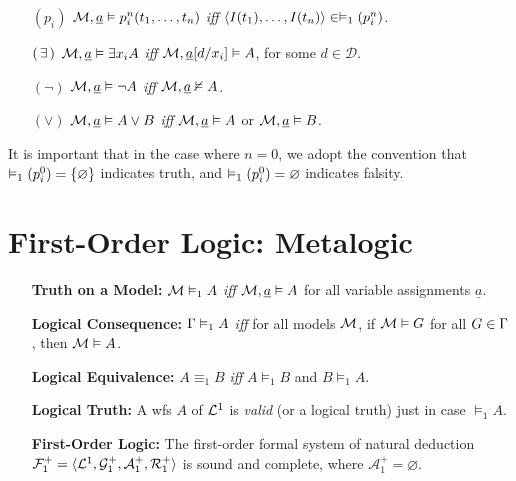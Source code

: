 \documentclass[a4paper, 11pt]{article} %
\begin{document}
\begin{enumerate}[leftmargin=1.2in]
\begin{small}
		      \begin{itemize}[leftmargin=.36in]
			      \item[$(p_i)$] $\mathcal{M},\underline{a}\vDash  p_i^n(t_1,\dots,t_n)$ \textit{iff} $\langle I(t_1),\dots,I(t_n)\rangle\in \vDash_1(p_i^n)$.
			      \item[$(\hspace{1.5pt}\exists\hspace{1.5pt})$] $\mathcal{M},\underline{a}\vDash  \exists x_iA$ \textit{iff} $\mathcal{M},\underline{a}[d/x_i]\vDash A$, for some $d\in\mathcal{D}$.
			      \item[$(\neg)$] $\mathcal{M},\underline{a}\vDash  \neg A$ \textit{iff} $\mathcal{M},\underline{a}\nvDash A$.
			      \item[$(\vee)$] $\mathcal{M},\underline{a}\vDash  A\vee B$ \textit{iff} $\mathcal{M},\underline{a}\vDash  A$ or $\mathcal{M},\underline{a}\vDash  B$.
		      \end{itemize}
	      \end{small}
	      It is important that in the case where $n=0$, we adopt the convention that $\vDash_1(p_i^0)=\lbrace\varnothing\rbrace$ indicates truth, and $\vDash_1(p_i^0)=\varnothing$ indicates falsity.
\end{enumerate}



\section*{\sc First-Order Logic: Metalogic}%

\begin{enumerate}[leftmargin=1.2in] %
	\item[\bf Truth on a Model:] $\mathcal{M}\vDash_1 A$ \textit{iff} $\mathcal{M},\underline{a}\vDash A$ for all variable assignments $\underline{a}$.
	\item[\bf Logical Consequence:] $\Gamma\vDash_1 A$ \textit{iff} for all models $\mathcal{M}$, if $\mathcal{M}\vDash G$ for all $G\in\Gamma$, then $\mathcal{M}\vDash A$.
	\item[\bf Logical Equivalence:] $A\equiv_1 B$ \textit{iff} $A\vDash_1 B$ and $B\vDash_1 A$.
	\item[\bf Logical Truth:] A wfs $A$ of $\mathcal{L}^1$ is \textit{valid} (or a logical truth) just in case $\vDash_1 A$.
	\item[\bf First-Order Logic:] The first-order formal system of natural deduction $\mathcal{F}_1^+=\langle\mathcal{L}^1,\mathcal{G}_1^+,\mathcal{A}_1^+,\mathcal{R}_1^+\rangle$ is sound and complete, where $\mathcal{A}_1^+=\varnothing$.
\end{enumerate}
\end{document}
